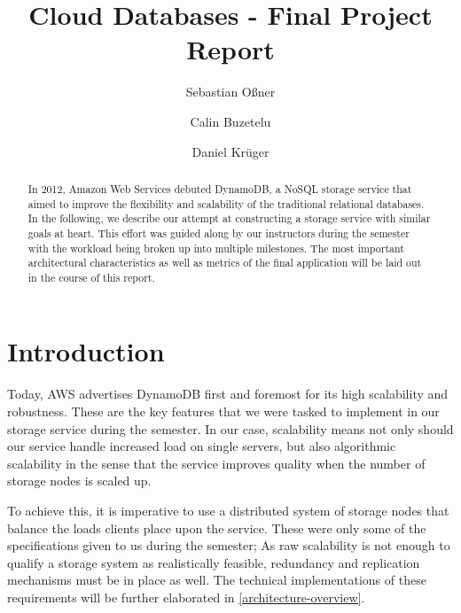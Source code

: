 \documentclass[sigconf]{acmart}
\begin{document}
\title{Cloud Databases - Final Project Report}

\author{Sebastian Oßner}

\author{Calin Buzetelu}

\author{Daniel Krüger}

\begin{abstract}
  In 2012, Amazon Web Services debuted DynamoDB, a NoSQL storage service that aimed to improve the flexibility and scalability of the traditional relational databases. In the following, we describe our attempt at constructing a storage service with similar goals at heart. This effort was guided along by our instructors during the semester with the workload being broken up into multiple milestones. The most important architectural characteristics as well as metrics of the final application will be laid out in the course of this report.
\end{abstract}


\maketitle
\section{Introduction}
Today, AWS advertises DynamoDB first and foremost for its high scalability and robustness.
These are the key features that we were tasked to implement in our storage service during the semester. In our case, scalability means not only should our service handle increased load on single servers, but also algorithmic scalability in the sense that the service improves quality when the number of storage nodes is scaled up.

To achieve this, it is imperative to use a distributed system of storage nodes that balance the loads clients place upon the service. These were only some of the specifications given to us during the semester; As raw scalability is not enough to qualify a storage system as realistically feasible, redundancy and replication mechanisms must be in place as well. The technical implementations of these requirements will be further elaborated in \ref{architecture-overview}.
\end{document}
